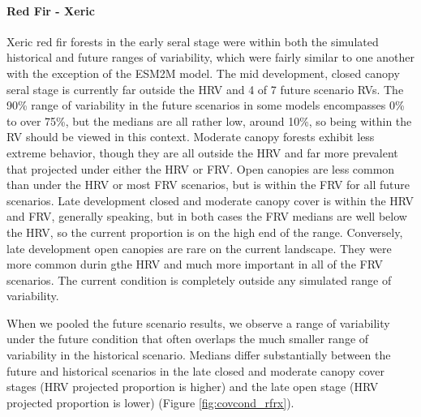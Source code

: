 \paragraph{Red Fir - Xeric} Xeric red fir forests in the early seral stage were within both the simulated historical and future ranges of variability, which were fairly similar to one another with the exception of the ESM2M model. The mid development, closed canopy seral stage is currently far outside the HRV and 4 of 7 future scenario RVs. The 90\% range of variability in the future scenarios in some models encompasses 0\% to over 75\%, but the medians are all rather low, around 10\%, so being within the RV should be viewed in this context. Moderate canopy forests exhibit less extreme behavior, though they are all outside the HRV and far more prevalent that projected under either the HRV or FRV. Open canopies are less common than under the HRV or most FRV scenarios, but is within the FRV for all future scenarios. Late development closed and moderate canopy cover is within the HRV and FRV, generally speaking, but in both cases the FRV medians are well below the HRV, so the current proportion is on the high end of the range. Conversely, late development open canopies are rare on the current landscape. They were more common durin gthe HRV and much more important in all of the FRV scenarios. The current condition is completely outside any simulated range of variability. 

When we pooled the future scenario results, we observe a range of variability under the future condition that often overlaps the much smaller range of variability in the historical scenario. Medians differ substantially between the future and historical scenarios in the late closed and moderate canopy cover stages (HRV projected proportion is higher) and the late open stage (HRV projected proportion is lower) (Figure \ref{fig:covcond_rfrx}).

